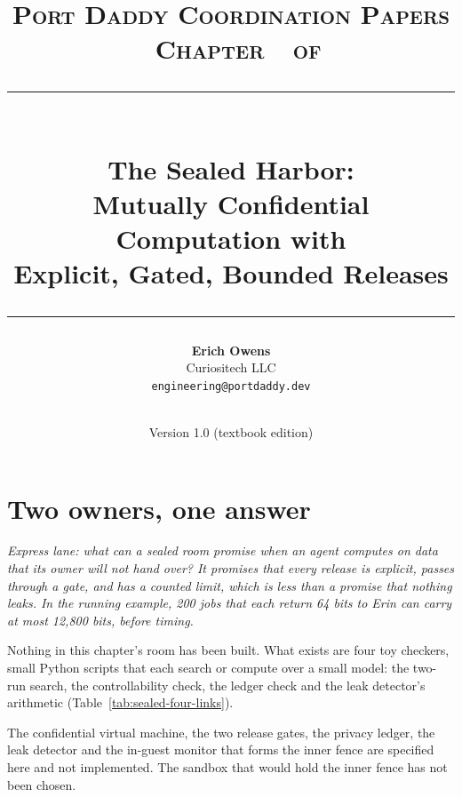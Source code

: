 \documentclass[11pt,a4paper]{article}
\title{
  \vspace{-1cm}
  {\Large\textsc{Port Daddy Coordination Papers \textperiodcentered\ Chapter~\pdchapternumber\ of \pdchaptercount}}\\[
0.5cm]
  \rule{\textwidth}{0.5pt}\\[0.3cm]
  {\LARGE\textbf{The Sealed Harbor:}}\\[0.2cm]
  {\Large Mutually Confidential Computation with\\Explicit, Gated, Bounded Releases}\\[0.3cm]
  \rule{\textwidth}{0.5pt}
}
\author{
  \textbf{Erich Owens}\\[0.2cm]
  Curiositech LLC\\[0.2cm]
  \texttt{engineering@portdaddy.dev}
}
\date{\pdeditiondate\\Version 1.0 (textbook edition)}
\theoremstyle{definition}
\begin{document}
\pdopensolutions
\setlength{\emergencystretch}{2em}
\maketitle
\thispagestyle{empty}
\vspace{1cm}
\section{Two owners, one answer}\label{sec:sealed-problem}
\noindent\emph{Express lane: what can a sealed room promise when an agent
computes on data that its owner will not hand over? It promises that every
release is explicit, passes through a gate, and has a counted limit, which is
less than a promise that nothing leaks. In the running example, 200 jobs that
each return 64 bits to Erin can carry at most 12,800 bits, before timing.}

\begin{pdboundary}
\setlength{\parskip}{4pt plus 1pt}
Nothing in this chapter's room has been built. What exists are four toy
checkers, small Python scripts that each search or compute over a small model:
the two-run search, the controllability check, the ledger check and the leak
detector's arithmetic (Table~\ref{tab:sealed-four-links}).

The confidential virtual machine, the two release gates, the privacy ledger,
the leak detector and the in-guest monitor that forms the inner fence are
specified here and not implemented. The sandbox that would hold the inner
fence has not been chosen.
\end{pdboundary}
\end{document}
